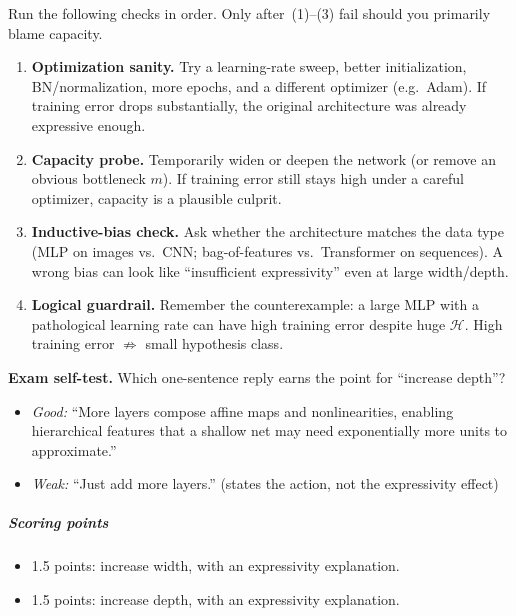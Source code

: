 \documentclass[11pt,a4paper]{article}
\theoremstyle{definition}
\begin{document}
\begin{checkpoint}
Run the following checks in order. Only after~(1)--(3) fail should you primarily blame capacity.
\begin{enumerate}[leftmargin=1.6em]
  \item \textbf{Optimization sanity.}
  Try a learning-rate sweep, better initialization, BN/normalization, more epochs, and a different optimizer (e.g.\ Adam).
  If training error drops substantially, the original architecture was already expressive enough.
  \item \textbf{Capacity probe.}
  Temporarily widen or deepen the network (or remove an obvious bottleneck $m$).
  If training error still stays high under a careful optimizer, capacity is a plausible culprit.
  \item \textbf{Inductive-bias check.}
  Ask whether the architecture matches the data type (MLP on images vs.\ CNN; bag-of-features vs.\ Transformer on sequences).
  A wrong bias can look like ``insufficient expressivity'' even at large width/depth.
  \item \textbf{Logical guardrail.}
  Remember the counterexample: a large MLP with a pathological learning rate can have high training error despite huge $\mathcal{H}$.
  High training error $\not\Rightarrow$ small hypothesis class.
\end{enumerate}
\vspace{0.35em}
\noindent\textbf{Exam self-test.}
Which one-sentence reply earns the point for ``increase depth''?
\begin{itemize}[leftmargin=1.4em]
  \item \textit{Good:} ``More layers compose affine maps and nonlinearities, enabling hierarchical features that a shallow net may need exponentially more units to approximate.''
  \item \textit{Weak:} ``Just add more layers.'' (states the action, not the expressivity effect)
\end{itemize}
\end{checkpoint}

\subparagraph{Scoring points}
\begin{itemize}
    \item 1.5 points: increase width, with an expressivity explanation.
    \item 1.5 points: increase depth, with an expressivity explanation.
\end{itemize}
\end{document}

